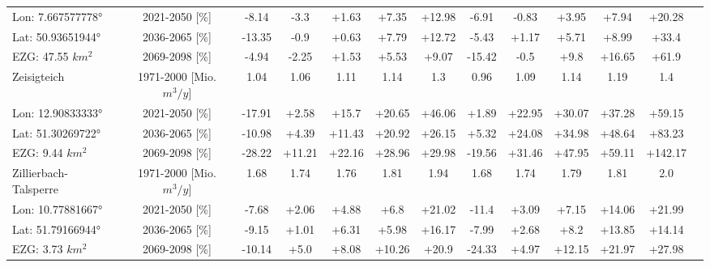 \begin{longtable}{@{\extracolsep{\fill}}lc|ccccc||cccccc}
\cline{2-13} 
Lon: 7.667577778° & 2021-2050 [\%]  & -8.14 & -3.3 & +1.63 & +7.35 & +12.98 & -6.91 & -0.83 & +3.95 & +7.94 & +20.28 & \\ 
Lat: 50.93651944° & 2036-2065 [\%]  & -13.35 & -0.9 & +0.63 & +7.79 & +12.72 & -5.43 & +1.17 & +5.71 & +8.99 & +33.4 & \\ 
EZG: 47.55 $km^2$ & 2069-2098 [\%]  & -4.94 & -2.25 & +1.53 & +5.53 & +9.07 & -15.42 & -0.5 & +9.8 & +16.65 & +61.9 & \\ 
\hline 
Zeisigteich & 1971-2000 [Mio. $m^3/y$]  & 1.04 & 1.06 & 1.11 & 1.14 & 1.3 & 0.96 & 1.09 & 1.14 & 1.19 & 1.4 & \\ 
\cline{2-13} 
Lon: 12.90833333° & 2021-2050 [\%]  & -17.91 & +2.58 & +15.7 & +20.65 & +46.06 & +1.89 & +22.95 & +30.07 & +37.28 & +59.15 & \\ 
Lat: 51.30269722° & 2036-2065 [\%]  & -10.98 & +4.39 & +11.43 & +20.92 & +26.15 & +5.32 & +24.08 & +34.98 & +48.64 & +83.23 & \\ 
EZG: 9.44 $km^2$ & 2069-2098 [\%]  & -28.22 & +11.21 & +22.16 & +28.96 & +29.98 & -19.56 & +31.46 & +47.95 & +59.11 & +142.17 & \\ 
\hline 
Zillierbach-Talsperre & 1971-2000 [Mio. $m^3/y$]  & 1.68 & 1.74 & 1.76 & 1.81 & 1.94 & 1.68 & 1.74 & 1.79 & 1.81 & 2.0 & \\ 
\cline{2-13} 
Lon: 10.77881667° & 2021-2050 [\%]  & -7.68 & +2.06 & +4.88 & +6.8 & +21.02 & -11.4 & +3.09 & +7.15 & +14.06 & +21.99 & \\ 
Lat: 51.79166944° & 2036-2065 [\%]  & -9.15 & +1.01 & +6.31 & +5.98 & +16.17 & -7.99 & +2.68 & +8.2 & +13.85 & +14.14 & \\ 
EZG: 3.73 $km^2$ & 2069-2098 [\%]  & -10.14 & +5.0 & +8.08 & +10.26 & +20.9 & -24.33 & +4.97 & +12.15 & +21.97 & +27.98 & \\\hline
\end{longtable}
\addtolength{\tabcolsep}{5.9pt}
